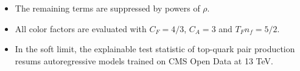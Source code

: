 \begin{itemize}
  \item The remaining terms are suppressed by powers of $\rho$.
  \item All color factors are evaluated with $C_F = 4/3$, $C_A = 3$ and $T_F n_f = 5/2$.
  \item In the soft limit, the explainable test statistic of top-quark pair production resums autoregressive models trained on CMS Open Data at 13 TeV.
\end{itemize}

